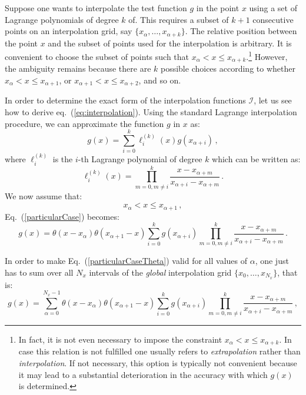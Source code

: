 \documentclass[10pt,a4paper]{article}
\begin{document}
Suppose one wants to interpolate the test function $g$ in the point
$x$ using a set of Lagrange polynomials of degree $k$ of. This
requires a subset of $k+1$ consecutive points on an interpolation
grid, say $\{x_{\alpha},\dots,x_{\alpha+k}\}$. The relative position
between the point $x$ and the subset of points used for the
interpolation is arbitrary. It is convenient to choose the subset of
points such that $x_\alpha < x \leq x_{\alpha+k}$.\footnote{In fact,
  it is not even necessary to impose the constraint
  $x_\alpha < x \leq x_{\alpha+k}$.  In case this relation is not
  fulfilled one usually refers to \textit{extrapolation} rather than
  \textit{interpolation}. If not necessary, this option is typically
  not convenient because it may lead to a substantial deterioration in
  the accuracy with which $g(x)$ is determined.}  However, the
ambiguity remains because there are $k$ possible choices according to
whether $x_\alpha < x \leq x_{\alpha+1}$, or
$x_{\alpha+1} < x \leq x_{\alpha+2}$, and so on.

In order to determine the exact form of the interpolation functions
$\mathcal{I}$, let us see how to derive
eq.~(\ref{eq:interpolation}). Using the standard Lagrange
interpolation procedure, we can approximate the function $g$ in $x$
as:
\begin{equation}\label{particularCase}
g(x) = \sum_{i=0}^k\ell_i^{(k)}(x)g(x_{\alpha+i})\,,
\end{equation}
where $\ell_i^{(k)}$ is the $i$-th Lagrange polynomial of degree $k$
which can be written as:
\begin{equation} \ell_i^{(k)}(x) = \prod^{k}_{m=0,m\ne
i}\frac{x-x_{\alpha+m}}{x_{\alpha+i}-x_{\alpha+m}}\,.
\end{equation}
We now assume that:
\begin{equation}\label{eq:assumption1}
x_{\alpha} < x \leq x_{\alpha+1}\,,
\end{equation}
Eq.~(\ref{particularCase}) becomes:
\begin{equation}\label{particularCaseTheta}
  g(x) =
  \theta(x-x_{\alpha})\theta(x_{\alpha+1}-x)\sum_{i=0}^k
  g(x_{\alpha+i})\prod^{k}_{m=0,m\ne
    i}\frac{x-x_{\alpha+m}}{x_{\alpha+i}-x_{\alpha+m}}\,.
\end{equation}

In order to make Eq.~(\ref{particularCaseTheta}) valid for all values
of $\alpha$, one just has to sum over all $N_x$ intervals of the
\textit{global} interpolation grid $\{x_0,\dots,x_{N_x}\}$, that is:
\begin{equation}\label{generalCase}
  g(x) =
  \sum_{\alpha=0}^{N_x-1}\theta(x-x_{\alpha})\theta(x_{\alpha+1}-x)\sum_{i=0}^k
  g(x_{\alpha+i})\prod^{k}_{m=0,m\ne
    i}\frac{x-x_{\alpha+m}}{x_{\alpha+i}-x_{\alpha+m}}\,,
\end{equation}
\end{document}
